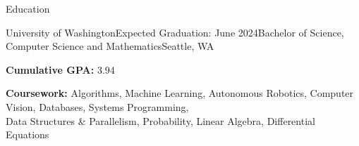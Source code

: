 \documentclass{resume} %
\begin{document}
\vspace{-0.5em} %


\begin{rSection}{Education}

\begin{education}{University of Washington}{Expected Graduation: June 2024}{Bachelor of Science, Computer Science and Mathematics}{Seattle, WA}
\item \textbf{Cumulative GPA:} 3.94
\item \textbf{Coursework:} Algorithms, Machine Learning, Autonomous Robotics, Computer Vision, Databases, Systems Programming, \\ Data Structures \& Parallelism, Probability, Linear Algebra, Differential Equations
\end{education}

\end{rSection}

\end{document}
